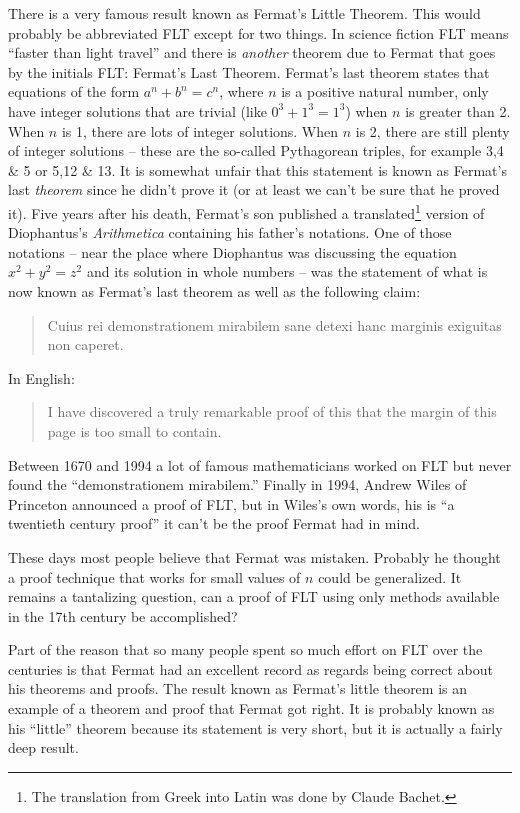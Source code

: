 There is a very famous result known as 
Fermat's Little Theorem.  
This would probably be abbreviated FLT except for two things.
In science fiction FLT means ``faster than light travel'' and 
there is \emph{another} theorem due to Fermat that goes by
the initials FLT: Fermat's Last Theorem.  
Fermat's last theorem states that equations of the form $a^n+b^n=c^n$,
where $n$ is a positive natural number, 
only have integer solutions that are trivial (like $0^3+1^3=1^3$) when $n$
is greater than 2.  When $n$ is 1, there are lots of integer solutions.
When $n$ is 2, there are still plenty of integer solutions -- these are the
so-called Pythagorean triples, for example 3,4 \& 5 or 5,12 \& 13.  
It is somewhat unfair that this statement is known as Fermat's last \emph{theorem} since he didn't prove it (or at least we can't be sure that he proved it).
Five years after his death, Fermat's son published a translated\footnote{The
translation from Greek into Latin was done by Claude Bachet.} version of
Diophantus's \emph{Arithmetica} containing his father's notations.  One of
those notations -- near the place where Diophantus was discussing the
equation $x^2+y^2=z^2$ and its solution in whole numbers -- was the statement
of what is now known as Fermat's last theorem as well as the following claim:

\begin{quote}
Cuius rei demonstrationem mirabilem sane detexi hanc marginis exiguitas non caperet.
\end{quote}

In English:

\begin{quote}
I have discovered a truly remarkable proof of this that the margin of this page is too small to contain.
\end{quote}

Between 1670 and 1994 a lot of famous mathematicians worked on FLT but
never found the ``demonstrationem mirabilem.''  Finally in 1994, Andrew Wiles
of Princeton announced a proof of FLT, but in Wiles's own words, his is ``a twentieth century proof'' it can't be the proof Fermat had in mind. 

These days most people believe that Fermat was mistaken.  Probably he thought
a proof technique that works for small values of $n$ could be generalized.  
It remains a tantalizing question, can a proof of FLT using only methods
available in the 17th century be accomplished?  

Part of the reason that so many people spent so much effort on FLT
over the centuries is that Fermat had an excellent record as regards
being correct about his theorems and proofs.  The result known as Fermat's
little theorem is an example of a theorem and proof that Fermat got 
right.  It is probably known as his ``little'' theorem because its 
statement is very short, but it is actually a fairly deep result.

